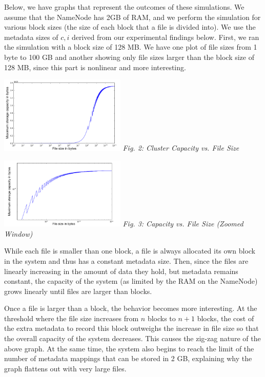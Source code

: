 \documentclass[11pt, a4paper]{article}
\begin{document}
\begin{multicols*}{2}
Below, we have graphs that represent the outcomes of these simulations. We assume that the NameNode has 2GB of RAM, and we perform the simulation for various block sizes (the size of each block that a file is divided into). We use the metadata sizes of $c, i$ derived from our experimental findings below. First, we ran the simulation with a block size of 128 MB. We have one plot of file sizes from 1 byte to 100 GB and another showing only file sizes larger than the block size of 128 MB, since this part is nonlinear and more interesting. 
\begin{center}
	\includegraphics[keepaspectratio=true, width=0.45\textwidth]{logScale}
	\textit{Fig. 2: Cluster Capacity vs. File Size}
\end{center}

\begin{center}
	\includegraphics[keepaspectratio=true, width=0.45\textwidth]{logLogScale}
	\textit{Fig. 3: Capacity vs. File Size (Zoomed Window)}	
\end{center}

While each file is smaller than one block, a file is always allocated its own block in the system and thus has a constant metadata size. Then, since the files are linearly increasing in the amount of data they hold, but metadata remains constant, the capacity of the system (as limited by the RAM on the NameNode) grows linearly until files are larger than blocks. 

Once a file is larger than a block, the behavior becomes more interesting. At the threshold where the file size increases from $n$ blocks to $n+1$ blocks, the cost of the extra metadata to record this block outweighs the increase in file size so that the overall capacity of the system decreases. This causes the zig-zag nature of the above graph. At the same time, the system also begins to reach the limit of the number of metadata mappings that can be stored in 2 GB, explaining why the graph flattens out with very large files. 


\end{multicols*}
\end{document}
